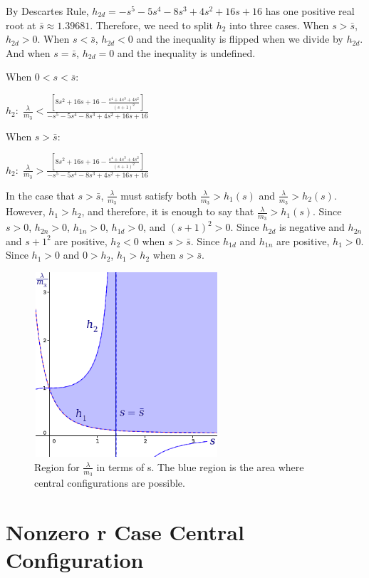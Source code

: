 \documentclass[11pt,leqno]{article}
\theoremstyle{definition}
\theoremstyle{remark}
\numberwithin{equation}{section}
\begin{document}
By Descartes Rule, $h_{2d}=-s^{5}-5s^{4}-8s^{3}+4s^{2}+16s+16$ has one positive real root at $\bar{s}\approx1.39681$. Therefore, we need to split $h_2$ into three cases.  When $s>\bar{s}$, $h_{2d}>0$. When $s<\bar{s}$, $h_{2d}<0$ and the inequality is flipped when we divide by $h_{2d}$. And when $s=\bar{s}$, $h_{2d}=0$ and the inequality is undefined.

When $0<s<\bar{s}$:

$h_{2}:\;\frac{\lambda}{m_{3}}<\frac{[8s^{2}+16s+16-\frac{s^{4}+4s^{3}+4s^{2}}{(s+1)^{2}}]}{-s^{5}-5s^{4}-8s^{3}+4s^{2}+16s+16}$

When $s>\bar{s}$:

$h_{2}:\;\frac{\lambda}{m_{3}}>\frac{[8s^{2}+16s+16-\frac{s^{4}+4s^{3}+4s^{2}}{(s+1)^{2}}]}{-s^{5}-5s^{4}-8s^{3}+4s^{2}+16s+16}$

In the case that $s>\bar{s}$, $\frac{\lambda}{m_3}$ must satisfy both $\frac{\lambda}{m_{3}}>h_{1}(s)$ and $\frac{\lambda}{m_{3}}>h_{2}(s)$. However, $h_{1} > h_2$, and therefore, it is enough to say that $\frac{\lambda}{m_{3}}>h_{1}(s)$. Since $s>0$, $h_{2n} > 0$, $h_{1n} >0$, $h_{1d}>0$, and $(s+1)^2>0$. Since $h_{2d}$ is negative and $h_{2n}$ and ${s+1}^2$ are positive, $h_{2}<0$ when $s>\bar{s}$. Since $h_{1d}$ and $h_{1n}$ are positive, $h_1>0$. Since $h_1>0$ and $0>h_2$, $h_1>h_2$ when $s>\bar{s}$.  

\begin{center}
\begin{figure}
\includegraphics[width=2.7in, height=2.7in]{Lm3RegionSpecialCase.png}
 \caption{ \label{EL}  Region for $\frac{\lambda}{m_3}$ in terms of s. The blue region is the area where central configurations are possible.  }
\end{figure}
\end{center}


\section{Nonzero r Case Central Configuration}
\end{document}
